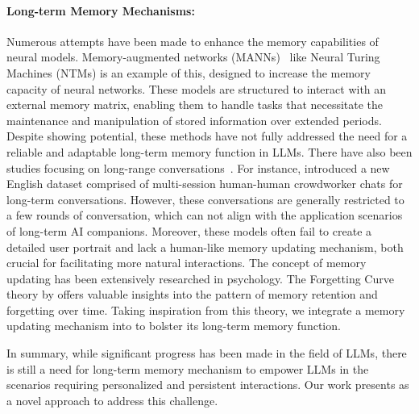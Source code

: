 \paragraph{Long-term Memory Mechanisms:}
Numerous attempts have been made to enhance the memory capabilities of neural models. Memory-augmented networks (MANNs)~\citep{meng2018dialogue,graves2014neural} like Neural Turing Machines (NTMs)\citep{graves2014neural} is an example of this, designed to increase the memory capacity of neural networks. These models are structured to interact with an external memory matrix, enabling them to handle tasks that necessitate the maintenance and manipulation of stored information over extended periods. Despite showing potential, these methods have not fully addressed the need for a reliable and adaptable long-term memory function in LLMs.
There have also been studies focusing on long-range conversations~\citep{xu2021beyond,xu2022long}. For instance, \citet{xu2021beyond} introduced a new English dataset comprised of multi-session human-human crowdworker chats for long-term conversations. However, these conversations are generally restricted to a few rounds of conversation, which can not align with the application scenarios of long-term AI companions. Moreover, these models often fail to create a detailed user portrait and lack a human-like memory updating mechanism, both crucial for facilitating more natural interactions.
The concept of memory updating has been extensively researched in psychology. The Forgetting Curve theory by \cite{ebbinghaus1964memory} offers valuable insights into the pattern of memory retention and forgetting over time. Taking inspiration from this theory, we integrate a memory updating mechanism into \method to bolster its long-term memory function.

In summary, while significant progress has been made in the field of LLMs, there is still a need for  long-term memory mechanism to empower LLMs in the scenarios requiring personalized and persistent interactions.
Our work presents \method as a novel approach to address this challenge.